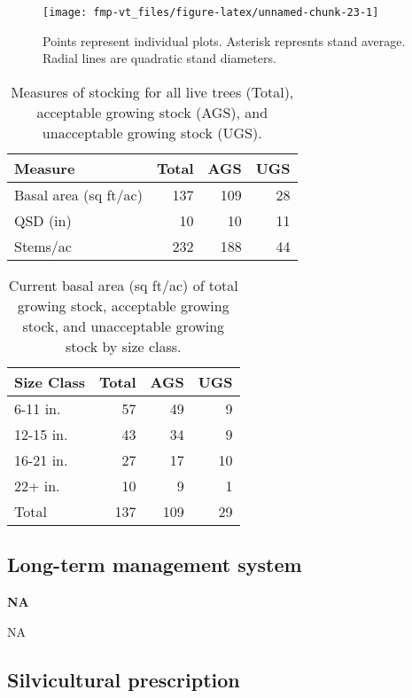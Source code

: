 \documentclass[]{tufte-handout}
\begin{document}
\begin{figure}
\texttt{[image: fmp-vt\_files/figure-latex/unnamed-chunk-23-1]} \caption[Points represent individual plots]{Points represent individual plots. Asterisk represnts stand average. Radial lines are quadratic stand diameters.}\label{fig:unnamed-chunk-23}
\end{figure}

\begin{table}

\caption{\label{tab:unnamed-chunk-24}Measures of stocking for all live trees (Total), acceptable growing stock (AGS), and unacceptable growing stock (UGS).}
\centering
\begin{tabular}[t]{lrrr}
\toprule
Measure & Total & AGS & UGS\\
\midrule
Basal area (sq ft/ac) & 137 & 109 & 28\\
QSD (in) & 10 & 10 & 11\\
Stems/ac & 232 & 188 & 44\\
\bottomrule
\end{tabular}
\end{table}

\begin{table}

\caption{\label{tab:unnamed-chunk-25}Current basal area (sq ft/ac) of total growing stock, acceptable growing stock, and unacceptable growing stock by size class.}
\centering
\begin{tabular}[t]{lrrr}
\toprule
Size Class & Total & AGS & UGS\\
\midrule
6-11 in. & 57 & 49 & 9\\
12-15 in. & 43 & 34 & 9\\
16-21 in. & 27 & 17 & 10\\
22+ in. & 10 & 9 & 1\\
Total & 137 & 109 & 29\\
\bottomrule
\end{tabular}
\end{table}

\subsection{Long-term management
system}\label{long-term-management-system-3}

\textbf{NA}

NA

\subsection{Silvicultural
prescription}\label{silvicultural-prescription-3}
\end{document}
